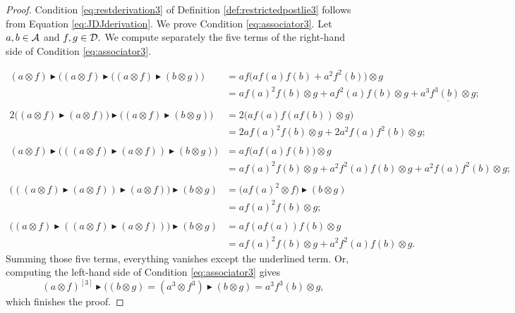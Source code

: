\documentclass[12pt]{article}
\newcommand {\A}{{\cal{A}}}
\newcommand{\D}{{\cal{D}}}
\newcommand{\btr}{\blacktriangleright}
\begin{document}
      \begin{proof}
Condition \eqref{eq:restderivation3} of Definition \ref{def:restrictedpostlie3} follows from Equation \eqref{eq:JDJderivation}. We prove Condition \eqref{eq:associator3}. Let $a,b\in \A $ and $ f,g\in \D.$ We compute separately the five terms of the right-hand side of Condition \eqref{eq:associator3}.

        \begin{align*}
            (a\otimes f)\btr\bigl((a\otimes f)\btr((a\otimes f)\btr(b\otimes g)\bigl)&=af\bigl(af(a)f(b)+a^2f^2(b)\bigl)\otimes g\\
                    &=af(a)^2f(b)\otimes g+af^2(a)f(b)\otimes g+\underline{a^3f^3(b)\otimes g};\\
                    &~\\
            2\bigl((a\otimes f)\btr(a\otimes f)\bigl)\btr\bigl((a\otimes f)\btr(b\otimes g)\bigl)&=  2\bigl(af(a)f(af(b))\otimes g  \bigl)\\
            &=2af(a)^2f(b)\otimes g+2a^2f(a)f^2(b)\otimes g;\\
                    &~\\
            (a\otimes f)\btr\bigl(((a\otimes f)\btr (a\otimes f))\btr (b\otimes g) \bigl)&= af\bigl(af(a)f(b) \bigl)\otimes g\\
            &=af(a)^2f(b)\otimes g+a^2f^2(a)f(b)\otimes g+a^2f(a)f^2(b)\otimes g;\\
                    \end{align*}
                    \begin{align*}
            \bigl(  ((a\otimes f)\btr(a\otimes f))\btr(a\otimes f)  \bigl)\btr(b\otimes g)&=\bigl(af(a)^2\otimes f   \bigl)\btr(b\otimes g)\\
            &=af(a)^2f(b)\otimes g;\\
                    &~\\
            \bigl( (a\otimes f)\btr ((a\otimes f)\btr(a\otimes f) )   \bigl)\btr(b\otimes g)&=af(a f(a))f(b)\otimes g\\
            &= af(a)^2f(b)\otimes g+a^2f^2(a)f(b)\otimes g.
        \end{align*}
        Summing those five terms, everything vanishes except the underlined term. Or, computing the left-hand side of Condition
        \eqref{eq:associator3} gives
        \begin{equation}
            (a\otimes f)^{[3]}\btr((b\otimes g)=(a^3\otimes f^3)\btr(b\otimes g)=a^3f^3(b)\otimes g,
        \end{equation} which finishes the proof.
      \end{proof}
\end{document}
